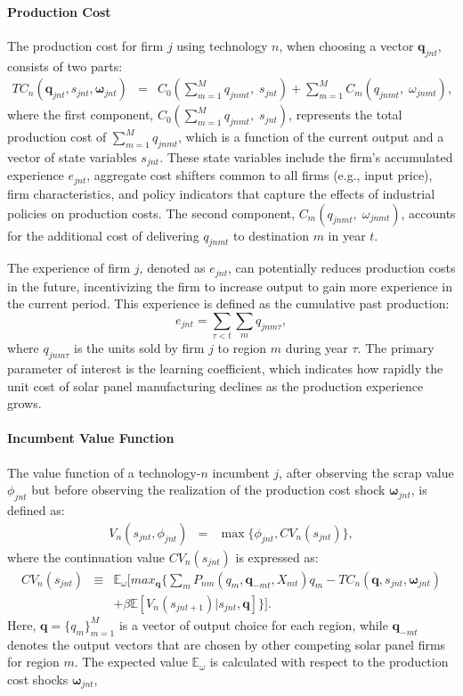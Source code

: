 \documentclass[12pt, letter]{article}
\begin{document}
\paragraph{Production Cost}
The production cost for firm $j$ using technology $n$, when choosing a vector $\mathbf{q}_{jnt}$, consists of two parts:
\begin{eqnarray}
   TC_{n}(\mathbf{q}_{jnt},s_{jnt},\mathbf{\omega}_{jnt})&=& C_0\!\left(\sum_{m=1}^M q_{jnmt},\; s_{jnt}\right) + \sum_{m=1}^M C_m\!\left(q_{jnmt},\; \omega_{jnmt}\right) \label{eq:model_c_q},
\end{eqnarray}
where the first component, $C_0\!\left(\sum_{m=1}^M q_{jnmt},\; s_{jnt}\right)$, represents the total production cost of $\sum_{m=1}^M q_{jnmt}$, which is a function of the current output and a vector of state variables $s_{jnt}$. These state variables include the firm's accumulated experience $e_{jnt}$, aggregate cost shifters common to all firms (e.g., input price), firm characteristics, and policy indicators that capture the effects of industrial policies on production costs. The second component, $C_m\!\left(q_{jnmt},\; \omega_{jnmt}\right)$, accounts for the additional cost of delivering $q_{jnmt}$ to destination $m$ in year $t$.

The experience of firm $j$, denoted as $e_{jnt}$, can potentially reduces production costs in the future, incentivizing the firm to increase output to gain more experience in the current period.  This experience is defined as the cumulative past production:
\[e_{jnt} = \sum_{\tau<t} \sum_m q_{jnm\tau},\]
where $q_{jnm\tau}$ is the units sold by firm $j$ to region $m$ during year $\tau$. The primary parameter of interest is the learning coefficient, which indicates how rapidly the unit cost of solar panel manufacturing declines as the production experience grows. 

\paragraph{Incumbent Value Function}
The value function of a technology-$n$ incumbent $j$, after observing the scrap value $\phi_{jnt}$ but before observing the realization of the production cost shock $\mathbf{\omega}_{jnt}$, is defined as:
\begin{eqnarray}
V_n(s_{jnt},\phi_{jnt})&=&\max\{\phi_{jnt},CV_n(s_{jnt})\},  \label{eq:incumbent_value_fn} 
\end{eqnarray}
where the continuation value $CV_n(s_{jnt})$  is expressed as:
\begin{eqnarray}
CV_n(s_{jnt}) & \equiv & \mathbb{E}_{\omega}\Big[ max_{\mathbf{q}} \{\sum_m P_{nm}(q_{m}, \mathbf{q}_{-mt},X_{mt}) q_{m} - TC_{n}(\mathbf{q},s_{jnt},\mathbf{\omega}_{jnt})  \nonumber \\
&& +\beta \mathbb{E}[V_n(s_{jnt+1})|s_{jnt}, \mathbf{q}] \}\Big]. \label{eq:incumbent_EV_fn}
\end{eqnarray}
Here, $\mathbf{q} = \{q_m\}_{m=1}^M$ is a vector of output choice for each region, while $\mathbf{q}_{-mt}$ denotes the output vectors that are chosen by other competing solar panel firms for region $m$. The expected value $\mathbb{E}_{\omega}$ is calculated with respect to the production cost shocks $\mathbf{\omega}_{jnt}$, 
\end{document}
